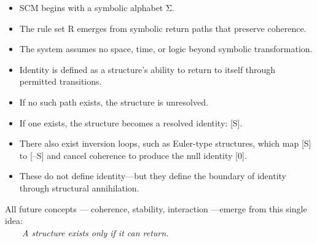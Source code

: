 \begin{itemize}
\item
  SCM begins with a symbolic alphabet Σ.
\item
  The rule set R emerges from symbolic return paths that preserve
  coherence.
\item
  The system assumes no space, time, or logic beyond symbolic
  transformation.
\item
  Identity is defined as a structure's ability to return to itself
  through permitted transitions.
\item
  If no such path exists, the structure is unresolved.
\item
  If one exists, the structure becomes a resolved identity: {[}S{]}.
\item
  There also exist inversion loops, such as Euler-type structures, which
  map {[}S{]} to {[}--S{]} and cancel coherence to produce the null
  identity {[}0{]}.
\item
  These do not define identity---but they define the boundary of
  identity through structural annihilation.
\end{itemize}

All future concepts --- coherence, stability, interaction ---emerge from
this single idea:\\
  \emph{A structure exists only if it can return.}